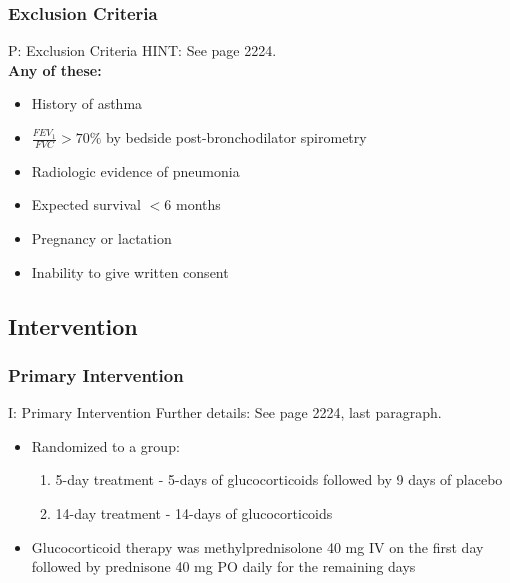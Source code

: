 \documentclass{beamer}
\begin{document}
		\subsubsection{Exclusion Criteria}
			\begin{frame}{P: Exclusion Criteria}
				HINT: See page 2224. \\
				\pause
				\textbf{Any of these:}
				\begin{itemize}
					\item History of asthma
					\item $\frac{FEV_1}{FVC} >70\%$ by bedside post-bronchodilator spirometry 
					\item Radiologic evidence of pneumonia
					\item Expected survival $<6$ months
					\item Pregnancy or lactation
					\item Inability to give written consent
				\end{itemize}
			\end{frame}
	\subsection{Intervention}
		\subsubsection{Primary Intervention}
			\begin{frame}{I: Primary Intervention}
				Further details: See page 2224, last paragraph.\\
				\begin{itemize}
					\item Randomized to a group:
					\begin{enumerate}
						\item 5-day treatment - 5-days of glucocorticoids followed by 9 days of placebo
						\item 14-day treatment - 14-days of glucocorticoids
					\end{enumerate}
					\item Glucocorticoid therapy was methylprednisolone 40 mg IV on the first
					day followed by prednisone 40 mg PO daily for the remaining days
				\end{itemize}
			\end{frame}
\end{document}

